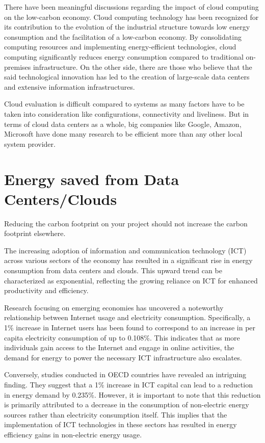 \documentclass[
  a4paper,  %
  twoside,  %
  bibliography=totoc,
  headsepline,
  cleardoublepage=empty,
  parskip=half,
  draft=false
]{scrbook}
\begin{document}
There have been meaningful discussions regarding the impact of cloud computing on the low-carbon economy\cite{tao2022can}. Cloud computing technology has been recognized for its contribution to the evolution of the industrial structure towards low energy consumption and the facilitation of a low-carbon economy. By consolidating computing resources and implementing energy-efficient technologies, cloud computing significantly reduces energy consumption compared to traditional on-premises infrastructure\cite{shahbaz2022impact}. On the other side, there are those who believe that the said technological innovation has led to the creation of large-scale data centers and extensive information infrastructures.

Cloud evaluation is difficult compared to systems as many factors have to be taken into consideration like configurations, connectivity and liveliness. But in terms of cloud data centers as a whole, big companies like Google, Amazon, Microsoft have done many research to be efficient  more than any other local system provider\cite{google-datacenters}.


\chapter{Energy saved from Data Centers/Clouds}

Reducing the carbon footprint on your project should not increase the carbon footprint elsewhere.

The increasing adoption of information and communication technology (ICT) across various sectors of the economy has resulted in a significant rise in energy consumption from data centers and clouds. This upward trend can be characterized as exponential, reflecting the growing reliance on ICT for enhanced productivity and efficiency.

Research focusing on emerging economies has uncovered a noteworthy relationship between Internet usage and electricity consumption. Specifically, a 1\% increase in Internet users has been found to correspond to an increase in per capita electricity consumption of up to 0.108\%. This indicates that as more individuals gain access to the Internet and engage in online activities, the demand for energy to power the necessary ICT infrastructure also escalates.

Conversely, studies conducted in OECD countries have revealed an intriguing finding. They suggest that a 1\% increase in ICT capital can lead to a reduction in energy demand by 0.235\%. However, it is important to note that this reduction is primarily attributed to a decrease in the consumption of non-electric energy sources rather than electricity consumption itself. This implies that the implementation of ICT technologies in these sectors has resulted in energy efficiency gains in non-electric energy usage.
\end{document}
